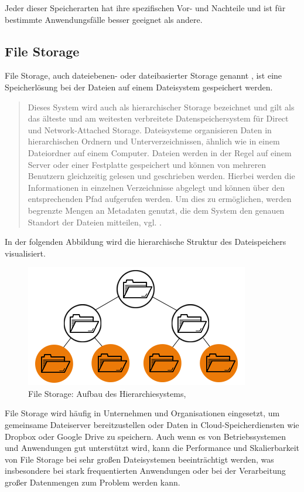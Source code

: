 Jeder dieser Speicherarten hat ihre spezifischen Vor- und Nachteile und ist für bestimmte Anwendungsfälle besser geeignet als andere. 

\newpage
 
\subsection{File Storage}

File Storage, auch dateiebenen- oder dateibasierter Storage genannt \cite{redHat-storage}, ist eine Speicherlösung bei der Dateien auf einem Dateisystem gespeichert werden. 

\begin{quote}
	Dieses System wird auch als hierarchischer Storage bezeichnet und gilt als das älteste und am weitesten verbreitete Datenspeichersystem für Direct und Network-Attached Storage. Dateisysteme organisieren Daten in hierarchischen Ordnern und Unterverzeichnissen, ähnlich wie in einem Dateiordner auf einem Computer. Dateien werden in der Regel auf einem Server oder einer Festplatte gespeichert und können von mehreren Benutzern gleichzeitig gelesen und geschrieben werden. Hierbei werden die Informationen in einzelnen Verzeichnisse abgelegt und können über den entsprechenden Pfad aufgerufen werden. Um dies zu ermöglichen, werden begrenzte Mengen an Metadaten genutzt, die dem System den genauen Standort der Dateien mitteilen, vgl. \citeauthor{redHat-storage}.
\end{quote}

In der folgenden Abbildung wird die hierarchische Struktur des Dateispeichers visualisiert.

\begin{figure}[h]
\centering
	\includegraphics{Pictures/FileStorageHierarchy.png}
	\caption{File Storage: Aufbau des Hierarchiesystems, \citeauthor{redHat-storage}}
\end{figure}

File Storage wird häufig in Unternehmen und Organisationen eingesetzt, um gemeinsame Dateiserver bereitzustellen oder Daten in Cloud-Speicherdiensten wie Dropbox oder Google Drive zu speichern.
Auch wenn es von Betriebssystemen und Anwendungen gut unterstützt wird, kann die Performance und Skalierbarkeit von File Storage bei sehr großen Dateisystemen beeinträchtigt werden, was insbesondere bei stark frequentierten Anwendungen oder bei der Verarbeitung großer Datenmengen zum Problem werden kann. 

